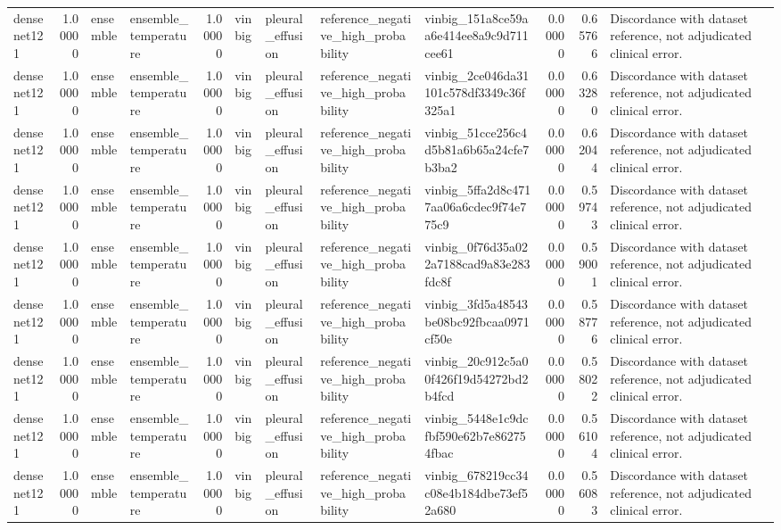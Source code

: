 \begin{tabular}{lrllrllllrrl}
densenet121 & 1.00000 & ensemble & ensemble\_temperature & 1.00000 & vinbig & pleural\_effusion & reference\_negative\_high\_probability & vinbig\_151a8ce59aa6e414ee8a9c9d711cee61 & 0.00000 & 0.65766 & Discordance with dataset reference, not adjudicated clinical error. \\
densenet121 & 1.00000 & ensemble & ensemble\_temperature & 1.00000 & vinbig & pleural\_effusion & reference\_negative\_high\_probability & vinbig\_2ce046da31101c578df3349c36f325a1 & 0.00000 & 0.63280 & Discordance with dataset reference, not adjudicated clinical error. \\
densenet121 & 1.00000 & ensemble & ensemble\_temperature & 1.00000 & vinbig & pleural\_effusion & reference\_negative\_high\_probability & vinbig\_51cce256c4d5b81a6b65a24cfe7b3ba2 & 0.00000 & 0.62044 & Discordance with dataset reference, not adjudicated clinical error. \\
densenet121 & 1.00000 & ensemble & ensemble\_temperature & 1.00000 & vinbig & pleural\_effusion & reference\_negative\_high\_probability & vinbig\_5ffa2d8c4717aa06a6cdec9f74e775c9 & 0.00000 & 0.59743 & Discordance with dataset reference, not adjudicated clinical error. \\
densenet121 & 1.00000 & ensemble & ensemble\_temperature & 1.00000 & vinbig & pleural\_effusion & reference\_negative\_high\_probability & vinbig\_0f76d35a022a7188cad9a83e283fdc8f & 0.00000 & 0.59001 & Discordance with dataset reference, not adjudicated clinical error. \\
densenet121 & 1.00000 & ensemble & ensemble\_temperature & 1.00000 & vinbig & pleural\_effusion & reference\_negative\_high\_probability & vinbig\_3fd5a48543be08bc92fbcaa0971cf50e & 0.00000 & 0.58776 & Discordance with dataset reference, not adjudicated clinical error. \\
densenet121 & 1.00000 & ensemble & ensemble\_temperature & 1.00000 & vinbig & pleural\_effusion & reference\_negative\_high\_probability & vinbig\_20c912c5a00f426f19d54272bd2b4fcd & 0.00000 & 0.58022 & Discordance with dataset reference, not adjudicated clinical error. \\
densenet121 & 1.00000 & ensemble & ensemble\_temperature & 1.00000 & vinbig & pleural\_effusion & reference\_negative\_high\_probability & vinbig\_5448e1c9dcfbf590e62b7e862754fbac & 0.00000 & 0.56104 & Discordance with dataset reference, not adjudicated clinical error. \\
densenet121 & 1.00000 & ensemble & ensemble\_temperature & 1.00000 & vinbig & pleural\_effusion & reference\_negative\_high\_probability & vinbig\_678219cc34c08e4b184dbe73ef52a680 & 0.00000 & 0.56083 & Discordance with dataset reference, not adjudicated clinical error. \\

\end{tabular}

